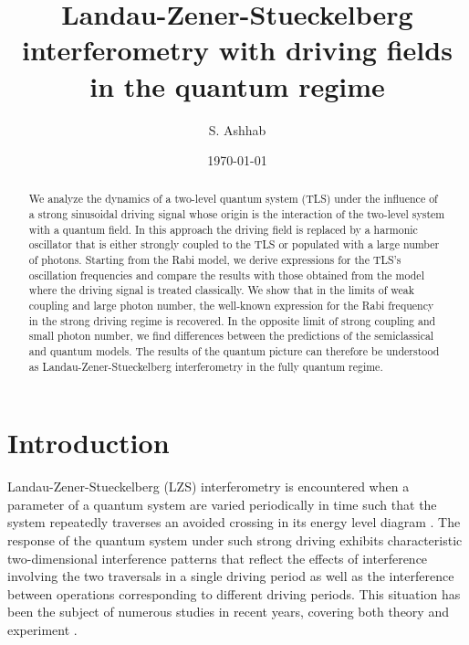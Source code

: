 \documentclass[aps,twocolumn,superscriptaddress]{revtex4}
\begin{document}
\title{Landau-Zener-Stueckelberg interferometry with driving fields in the quantum regime}


\author{S. Ashhab}


\date{\today}


\begin{abstract}
We analyze the dynamics of a two-level quantum system (TLS) under the influence of a strong sinusoidal driving signal whose origin is the interaction of the two-level system with a quantum field. In this approach the driving field is replaced by a harmonic oscillator that is either strongly coupled to the TLS or populated with a large number of photons. Starting from the Rabi model, we derive expressions for the TLS's oscillation frequencies and compare the results with those obtained from the model where the driving signal is treated classically. We show that in the limits of weak coupling and large photon number, the well-known expression for the Rabi frequency in the strong driving regime is recovered. In the opposite limit of strong coupling and small photon number, we find differences between the predictions of the semiclassical and quantum models. The results of the quantum picture can therefore be understood as Landau-Zener-Stueckelberg interferometry in the fully quantum regime.
\end{abstract}




\maketitle



\section{Introduction}
\label{Sec:Introduction}

Landau-Zener-Stueckelberg (LZS) interferometry is encountered when a parameter of a quantum system are varied periodically in time such that the system repeatedly traverses an avoided crossing in its energy level diagram \cite{Shevchenko}. The response of the quantum system under such strong driving exhibits characteristic two-dimensional interference patterns that reflect the effects of interference involving the two traversals in a single driving period as well as the interference between operations corresponding to different driving periods. This situation has been the subject of numerous studies in recent years, covering both theory \cite{Garraway,Shytov,Creffield,Shevchenko2005,Ashhab2007,Son} and experiment \cite{Oliver,Berns,Sillanpaa,Saito2006,Wilson,Sun,VanDitzhuijzen,Petta,Childress,Zhou,Silveri,Neilinger}.
\end{document}
